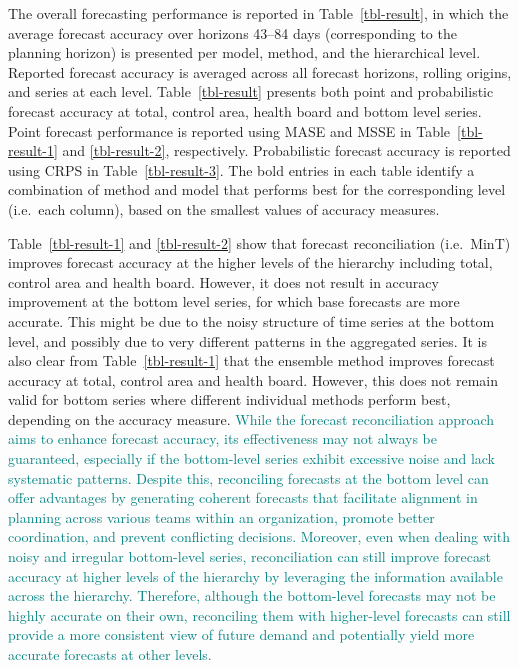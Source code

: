 \documentclass[
  authoryear,
  preprint,
  3p]{elsarticle}
\begin{document}
The overall forecasting performance is reported in
Table~\ref{tbl-result}, in which the average forecast accuracy over
horizons 43--84 days (corresponding to the planning horizon) is
presented per model, method, and the hierarchical level. Reported
forecast accuracy is averaged across all forecast horizons, rolling
origins, and series at each level. Table~\ref{tbl-result} presents both
point and probabilistic forecast accuracy at total, control area, health
board and bottom level series. Point forecast performance is reported
using MASE and MSSE in Table~\ref{tbl-result-1} and \ref{tbl-result-2},
respectively. Probabilistic forecast accuracy is reported using CRPS in
Table~\ref{tbl-result-3}. The bold entries in each table identify a
combination of method and model that performs best for the corresponding
level (i.e.~each column), based on the smallest values of accuracy
measures.

Table~\ref{tbl-result-1} and \ref{tbl-result-2} show that forecast
reconciliation (i.e.~MinT) improves forecast accuracy at the higher
levels of the hierarchy including total, control area and health board.
However, it does not result in accuracy improvement at the bottom level
series, for which base forecasts are more accurate. This might be due to
the noisy structure of time series at the bottom level, and possibly due
to very different patterns in the aggregated series. It is also clear
from Table~\ref{tbl-result-1} that the ensemble method improves forecast
accuracy at total, control area and health board. However, this does not
remain valid for bottom series where different individual methods
perform best, depending on the accuracy measure.
\textcolor{teal}{While the forecast reconciliation approach aims to enhance forecast accuracy, its effectiveness may not always be guaranteed, especially if the bottom-level series exhibit excessive noise and lack systematic patterns. Despite this, reconciling forecasts at the bottom level can offer advantages by generating coherent forecasts that facilitate alignment in planning across various teams within an organization, promote better coordination, and prevent conflicting decisions. Moreover, even when dealing with noisy and irregular bottom-level series, reconciliation can still improve forecast accuracy at higher levels of the hierarchy by leveraging the information available across the hierarchy. Therefore, although the bottom-level forecasts may not be highly accurate on their own, reconciling them with higher-level forecasts can still provide a more consistent view of future demand and potentially yield more accurate forecasts at other levels.}
\end{document}
